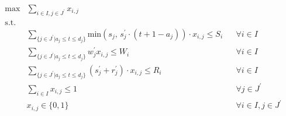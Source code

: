 \begin{align}
    \max & \sum_{i \in I, j \in J^{'}} x_{i,j} \label{eq:fixed-env-objective} \\
    \mbox{s.t.} \nonumber \\
    & \sum_{\{j \in J^{'} | a_j \leq t \leq d_j\}} \text{min}(s_j \text{, } s^{'}_j \cdot (t + 1 - a_j)) \cdot x_{i,j} \leq S_i && \forall{i \in I} \label{eq:fixed-server-storage-capacity} \\
    & \sum_{\{j \in J^{'} | a_j \leq t \leq d_j\}} w^{'}_j x_{i,j} \leq W_i && \forall{i \in I} \label{eq:fixed-server-computation-capacity} \\
    & \sum_{\{j \in J^{'} | a_j \leq t \leq d_j\}} (s^{'}_j + r^{'}_j) \cdot x_{i,j} \leq R_i && \forall{i \in I} \label{eq:fixed-server-bandwidth-capacity} \\
    & \sum_{i \in I} x_{i,j} \leq 1 && \forall{j \in J^{'}} \label{eq:fixed-env-allocation-limit} \\
    & x_{i,j} \in \{0, 1\} && \forall{i \in I, j \in J^{'}} \label{eq:fixed-env-allocation-set}
\end{align}